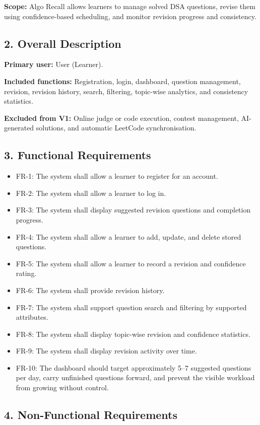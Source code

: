 \documentclass[12pt,a4paper]{report}
\begin{document}
\textbf{Scope:} Algo Recall allows learners to manage solved DSA questions, revise them using
confidence-based scheduling, and monitor revision progress and consistency.

\subsection*{2. Overall Description}
\textbf{Primary user:} User (Learner).

\textbf{Included functions:} Registration, login, dashboard, question management, revision,
revision history, search, filtering, topic-wise analytics, and consistency statistics.

\textbf{Excluded from V1:} Online judge or code execution, contest management, AI-generated
solutions, and automatic LeetCode synchronisation.

\subsection*{3. Functional Requirements}
\begin{itemize}
\item FR-1: The system shall allow a learner to register for an account.
\item FR-2: The system shall allow a learner to log in.
\item FR-3: The system shall display suggested revision questions and completion progress.
\item FR-4: The system shall allow a learner to add, update, and delete stored questions.
\item FR-5: The system shall allow a learner to record a revision and confidence rating.
\item FR-6: The system shall provide revision history.
\item FR-7: The system shall support question search and filtering by supported attributes.
\item FR-8: The system shall display topic-wise revision and confidence statistics.
\item FR-9: The system shall display revision activity over time.
\item FR-10: The dashboard should target approximately 5--7 suggested questions per day,
carry unfinished questions forward, and prevent the visible workload from growing without control.
\end{itemize}

\subsection*{4. Non-Functional Requirements}
\end{document}
